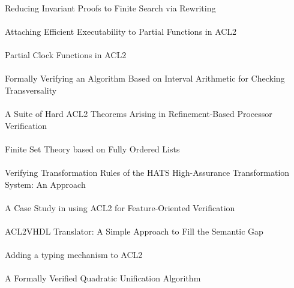 \documentclass{article}
\begin{document}
\cite{04-sumners-invariant} \\
Reducing Invariant Proofs to Finite Search via Rewriting \\

\cite{04-ray-partial} \\
Attaching Efficient Executability to Partial Functions in ACL2 \\

\cite{04-matthews-clock} \\
Partial Clock Functions in ACL2 \\

\cite{04-gameiro-interval} \\
Formally Verifying an Algorithm Based on Interval Arithmetic for Checking Transversality \\

\cite{04-manolios-hard} \\
A Suite of Hard ACL2 Theorems Arising in Refinement-Based Processor Verification \\

\cite{04-davis-sets} \\
Finite Set Theory based on Fully Ordered Lists \\

\cite{04-roach-hats} \\
Verifying Transformation Rules of the HATS High-Assurance Transformation System: An Approach \\

\cite{04-fisler-features} \\
A Case Study in using ACL2 for Feature-Oriented Verification \\

\cite{04-sawada-vhdl} \\
ACL2VHDL Translator: A Simple Approach to Fill the Semantic Gap \\

\cite{04-austel-typing} \\
Adding a typing mechanism to ACL2 \\

\cite{04-reina-unification} \\
A Formally Verified Quadratic Unification Algorithm \\
\end{document}
